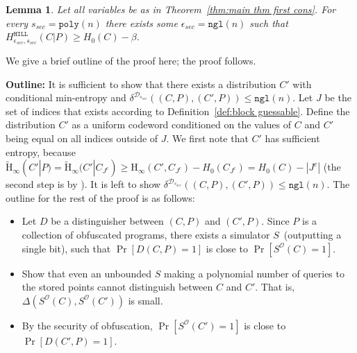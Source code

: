 \documentclass[11pt]{article}
\newcommand{\thref}[1]{\mbox{Theorem~\ref{#1}}}
\newcommand{\defref}[1]{\mbox{Definition~\ref{#1}}}
\newcommand{\hill}{\ensuremath{\mathtt{HILL}}\xspace}
\newcommand{\poly}{\ensuremath{\mathtt{poly}}\xspace}
\newcommand{\ngl}{\ensuremath{\mathtt{ngl}}\xspace}
\newcommand{\Hoo}{\mathrm{H}_\infty}
\newcommand{\Hav}{\tilde{\mathrm{H}}_\infty}
\newtheorem{lemma}[theorem]{Lemma}
\begin{document}
\begin{lemma}
\label{lem:security of cons}
Let all variables be as in \thref{thm:main thm first cons}.  For every $s_{sec} = \poly(n)$ there exists some $\epsilon_{sec} = \ngl(n)$ such that $H^{\hill}_{\epsilon_{sec}, s_{sec}}( C | P ) \geq H_0(C) - \beta$.
\end{lemma}

We give a brief outline of the proof here; the proof follows.

\noindent \textbf{Outline:}
It is sufficient to show that there exists a distribution $C'$ with conditional min-entropy and $\delta^{\mathcal{D}_{s_{sec}}}((C, P), (C', P))\le \ngl(n)$.  Let $J$ be the set of indices that exists according to \defref{def:block guessable}. Define the distribution $C'$ as a uniform codeword conditioned on the values of $C$ and $C'$ being equal on all indices outside of $J$.  We first note that $C'$ has sufficient entropy, because $\Hav(C' |P) = \Hav(C' | C_{J^c}) \ge \Hoo(C', C_{J^c}) - H_0(C_{J^c})  = H_0(C) - |J^c|$ (the second step is by \cite[Lemma 2.2b]{DBLP:journals/siamcomp/DodisORS08}).  It is left to show $\delta^{\mathcal{D}_{s_{sec}}}((C, P), (C', P)) \le \ngl(n)$.
The outline for the rest of the proof is as follows:
\begin{itemize}
\item Let $D$ be a distinguisher between $(C, P)$ and $(C', P)$. Since $P$ is a collection of obfuscated programs, there exists a simulator $S$~(outputting a single bit), such that $\Pr[D(C, P)=1]$ is close to $\Pr[S^{\mathcal{O}}(C)=1]$.
\item Show that even an unbounded $S$ making a polynomial number of queries to the stored points cannot distinguish between $C$ and $C'$.  That is, $\Delta(S^{\mathcal{O}}(C),S^{\mathcal{O}}(C'))$ is small.
\item By the security of obfuscation, $\Pr[S^{\mathcal{O}}(C')=1]$ is close to $\Pr[D(C', P)=1]$.
\end{itemize}
\end{document}
